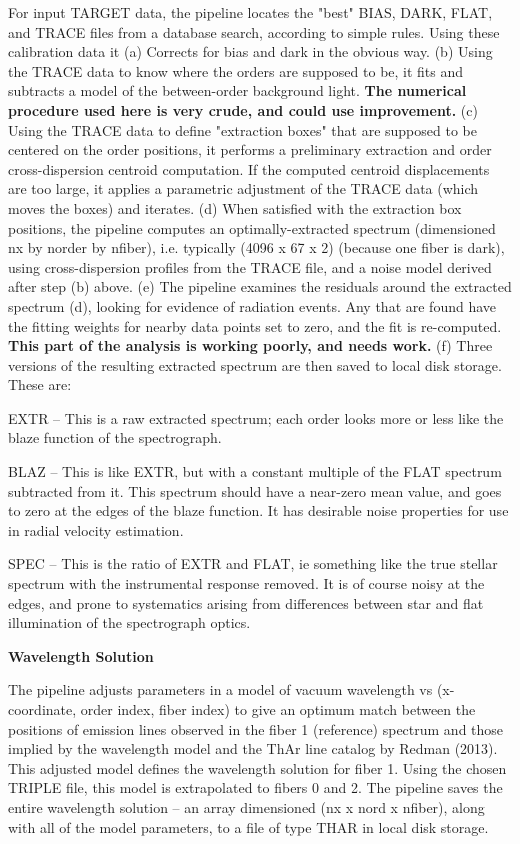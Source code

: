 For input TARGET data, the pipeline locates the "best" BIAS, DARK, FLAT,
and TRACE files from a database search, according to simple rules.
Using these calibration data it
(a) Corrects for bias and dark in the obvious way.
(b) Using the TRACE data to know where the orders are supposed to be, it
fits and subtracts a model of the between-order background light.
{\bf The numerical procedure used here is very crude, and could use
improvement.}
(c) Using the TRACE data to define "extraction boxes" that are supposed to
be centered on the order positions, it performs a preliminary extraction
and order cross-dispersion centroid computation.
If the computed centroid displacements are too large, it applies a parametric
adjustment of the TRACE data (which moves the boxes) and iterates.
(d) When satisfied with the extraction box positions, the pipeline computes
an optimally-extracted spectrum (dimensioned nx by norder by nfiber),
i.e. typically (4096 x 67 x 2) (because one fiber is dark),
using cross-dispersion profiles from the TRACE file, and a noise model 
derived after step (b) above.
(e) The pipeline examines the residuals around the extracted spectrum (d),
looking for evidence of radiation events.  Any that are found have the
fitting weights for nearby data points set to zero, and the fit is re-computed.
{\bf This part of the analysis is working poorly, and needs work.}
(f) Three versions of the resulting extracted spectrum are then saved
to local disk storage. These are:

EXTR -- This is a raw extracted spectrum;  each order looks more or less 
like the blaze function of the spectrograph.

BLAZ -- This is like EXTR, but with a constant multiple of the FLAT spectrum
subtracted from it.  This spectrum should have a near-zero mean value,
and goes to zero at the edges of the blaze function.
It has desirable noise properties for use in radial velocity estimation.

SPEC -- This is the ratio of EXTR and FLAT, ie something like the true
stellar spectrum with the instrumental response removed.
It is of course noisy at the edges, and prone to systematics arising from
differences between star and flat illumination of the spectrograph optics.

\vskip12pt
\parindent=0pt
{\bf{Wavelength Solution}}
\vskip8pt
\parindent20pt

The pipeline adjusts parameters in a model of vacuum wavelength vs (x-coordinate,
order index, fiber index) to give an optimum match between the positions
of emission lines observed in the fiber 1 (reference) spectrum and those
implied by the wavelength model and the ThAr line catalog by Redman (2013).
This adjusted model defines the wavelength solution for fiber 1.  Using the 
chosen TRIPLE file, this model is extrapolated to fibers 0 and 2.  
The pipeline saves the entire wavelength solution -- an array dimensioned 
(nx x nord x nfiber),
along with all of the model parameters, to a file of type THAR in local disk
storage.  

